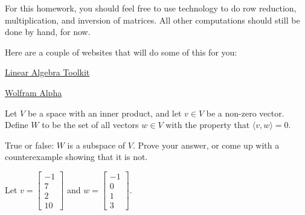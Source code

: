 




For this homework, you should feel free to use technology to do row reduction, multiplication, and inversion of matrices.  All other
computations should still be done by hand, for now.  

Here are a couple of websites that will do some of this for you:

\href{https://tinyurl.com/3xr6ed}{Linear Algebra Toolkit}

\href{https://www.wolframalpha.com/}{Wolfram Alpha}



\endedxtext


\endedxvertical




Let $V$ be a space with an inner product, and let $v\in V$ be a non-zero vector.  Define $W$ to be
the set of all vectors $w\in V$ with the property that $\langle v,w\rangle = 0$.  

True or false: $W$ is a subspace of $V$.  Prove your answer, or come up with a counterexample showing that it is not.  


 
\endedxproblem






Let $v = \left[ \begin{array}{c} -1 \\ 7 \\ 2 \\ 10 \end{array} \right]$ and 
$w = \left[ \begin{array}{c} -1 \\ 0 \\ 1 \\ 3 \end{array} \right]$.  

